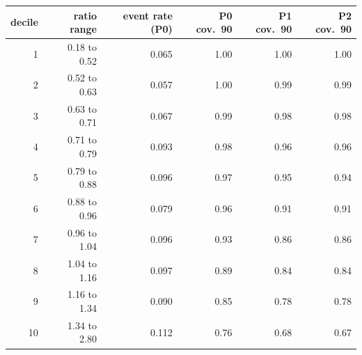 \begin{tabular}{rrrrrr}
\toprule
decile & ratio range & event rate (P0) & P0 cov.\ 90 & P1 cov.\ 90 & P2 cov.\ 90 \\
\midrule
1 & 0.18 to 0.52 & 0.065 & 1.00 & 1.00 & 1.00 \\
2 & 0.52 to 0.63 & 0.057 & 1.00 & 0.99 & 0.99 \\
3 & 0.63 to 0.71 & 0.067 & 0.99 & 0.98 & 0.98 \\
4 & 0.71 to 0.79 & 0.093 & 0.98 & 0.96 & 0.96 \\
5 & 0.79 to 0.88 & 0.096 & 0.97 & 0.95 & 0.94 \\
6 & 0.88 to 0.96 & 0.079 & 0.96 & 0.91 & 0.91 \\
7 & 0.96 to 1.04 & 0.096 & 0.93 & 0.86 & 0.86 \\
8 & 1.04 to 1.16 & 0.097 & 0.89 & 0.84 & 0.84 \\
9 & 1.16 to 1.34 & 0.090 & 0.85 & 0.78 & 0.78 \\
10 & 1.34 to 2.80 & 0.112 & 0.76 & 0.68 & 0.67 \\
\bottomrule
\end{tabular}
